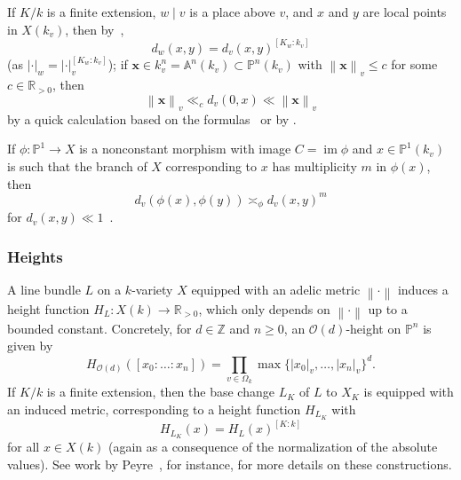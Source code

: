 \documentclass[a4paper, twoside, 11pt]{amsart}
\theoremstyle{definition}
\newcommand{\cO}{\mathcal{O}}
\newcommand{\bx}{{\boldsymbol{x}}}
\newcommand{\dA}{\mathbb{A}}
\newcommand{\PP}{\mathbb{P}}
\newcommand{\RR}{\mathbb{R}}
\newcommand{\ZZ}{\mathbb{Z}}
\DeclareMathOperator{\im}{im}
\newcommand{\norm}[1]{\left\lVert#1\right\rVert}
\begin{document}
If $K/k$ is a finite extension, $w\mid v$ is a place above $v$, and $x$ and $y$ are local points in $X(k_v)$, then by~\cite[Prop.~2.1]{McK-Roth},
\begin{equation}\label{eq:distance_extension}
	d_w(x,y) = d_v(x,y)^{[K_w:k_v]}
\end{equation}
(as $|\cdot|_w = |\cdot|_v^{[K_w:k_v]}$);
if $\bx\in k_v^n =  \dA^n(k_v)\subset \PP^n(k_v)$ with $\norm{\bx}_v\le c$ for some $c\in \RR_{>0}$, then
\begin{equation}\label{eq:distance_A1}
	\norm{\bx}_v \ll_c d_v(0,x) \ll \norm{\bx}_v
\end{equation}
by a quick calculation based on the formulas~\cite[(2.1--2)]{McK-Roth} or by \cite[Lemma 2.5]{McK-Roth}. 

If $\phi\colon \PP^1\to X$ is a nonconstant morphism with image $C=\im\phi$ and $x\in \PP^1(k_v)$ is such that the branch of $X$ corresponding to $x$ has multiplicity $m$ in $\phi(x)$, then
\begin{equation}\label{eq:distance_singularity}
	d_v(\phi(x),\phi(y)) \asymp_\phi d_v(x, y)^m
\end{equation}
for $d_v(x, y)\ll 1$~\cite[p.~537]{McK-Roth}.


\subsubsection*{Heights}
A line bundle $L$ on a $k$-variety $X$ equipped with an adelic metric $\norm{\cdot}$ induces a height function $H_L\colon X(k)\to \RR_{>0}$, which only depends on $\norm{\cdot}$ up to a bounded constant. Concretely, for $d\in \ZZ$ and $n\ge 0$, an $\cO(d)$-height on $\PP^n$ is given by 
\begin{equation*}
	H_{\cO(d)}([x_0:\dots:x_n]) = \prod_{v\in\Omega_k} \max\{|x_0|_v,\dots, |x_n|_v\}^d.
\end{equation*}
If $K/k$ is a finite extension, then the base change $L_K$ of $L$ to $X_K$ is equipped with an induced metric, corresponding to a height function $H_{L_K}$ with
\begin{equation}\label{eq:height_extension}
	H_{L_K}(x) = H_L(x)^{[K:k]}
\end{equation}
for all $x\in X(k)$ (again as a consequence of the normalization of the absolute values). See work by Peyre~\cite[\S\,2]{Peyre}, for instance, for more details on these constructions.
\end{document}
